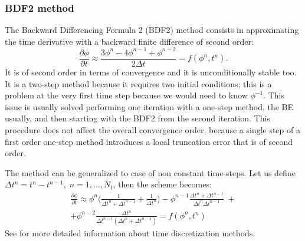 \subsubsection{BDF2 method}
The Backward Differencing Formula 2 (BDF2) method consists in approximating the 
time derivative with a backward finite difference of second order:
\begin{equation} \label{eq:bdf2}
\frac{\partial \phi}{\partial t} \approx 
\frac{3\phi^n-4\phi^{n-1}+\phi^{n-2}}{2\Delta t} = f(\phi^n, t^n).
\end{equation}
It is of second order in terms of convergence and it is 
unconditionally stable too. It is a two-step method because it requires two 
initial conditions; this is a problem at the very first time step because we 
would need to know $\phi^{-1}$. This issue is usually solved performing one 
iteration with a one-step method, the BE usually, and then starting with the 
BDF2 from the second iteration. This procedure does not affect the overall 
convergence order, because a single step of a first order one-step method 
introduces a local truncation error that is of second order.

The method can be generalized to case of non constant time-steps. Let us define 
$\Delta t^n=t^n-t^{n-1}, \; n=1,\dots,N_t$, then the scheme becomes:
\begin{multline} \label{eq:bdf2gen}
\frac{\partial \phi}{\partial t} \approx \phi^n\bigg( \frac{1}{\Delta t^n + 
	\Delta t^{n-1}} + \frac{1}{\Delta t^n}\bigg) - \phi^{n-1} \frac{\Delta t^n 
	+ \Delta t^{n-1}}{\Delta t^n \Delta t^{n-1}} \;+ \\+ \phi^{n-2} 
\frac{\Delta 
	t^n}{\Delta t^{n-1} (\Delta t^n + \Delta t^{n-1})} = f(\phi^n,t^n)
\end{multline}
See \cite{main:matenum} for more detailed information about time discretization 
methods.
%
